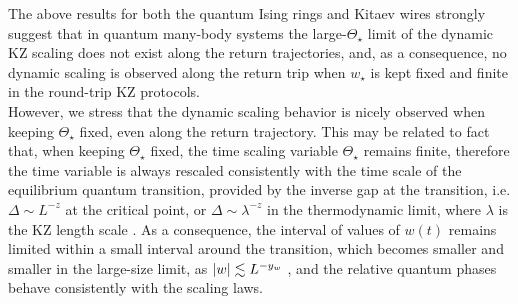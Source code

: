 The above results for both the quantum Ising rings
and Kitaev wires strongly suggest that in quantum many-body systems the 
large-$\Theta_\star$ limit of the dynamic KZ scaling does not exist along the return 
trajectories, and, as a consequence, no dynamic scaling is observed along the
return trip when $w_\star$ is kept fixed and finite in the
round-trip KZ protocols.\\

However, we stress that the dynamic scaling behavior
is nicely observed when keeping $\Theta_\star$ fixed, even along the
return trajectory. This may be related to fact that, when
keeping $\Theta_\star$ fixed, the time scaling variable $\Theta_\star$ remains 
finite, therefore the time variable is always rescaled 
consistently with the time scale of the equilibrium quantum
transition, provided by the inverse gap at the transition,
i.e. $\Delta \sim  L^{-z}$ at the critical point, or $\Delta \sim \lambda^{-z}$ 
in the thermodynamic limit, where $\lambda$ is the KZ length scale %
. As a consequence, the interval of values of $w(t)$ remains 
limited within a small interval around the transition, which
becomes smaller and smaller in the large-size limit, as
$\lvert w\rvert \lesssim L^{-y_w}$ , and the relative quantum phases behave
consistently with the scaling laws.

